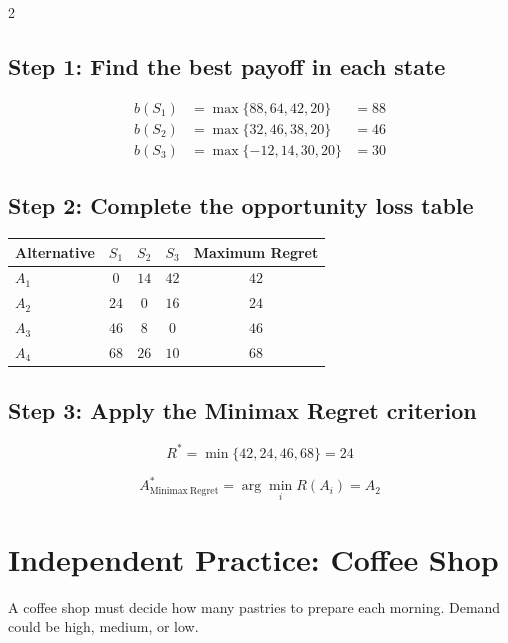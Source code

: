 \begin{multicols}{2}
		\subsection*{Step 1: Find the best payoff in each state}
		
		\[
		\begin{array}{lll}
			b(S_1) &= \max\{88,64,42,20\} &= 88 \\[3pt]
			b(S_2) &= \max\{32,46,38,20\} &= 46 \\[3pt]
			b(S_3) &= \max\{-12,14,30,20\} &= 30
		\end{array}
		\]
		
		\subsection*{Step 2: Complete the opportunity loss table}
		
		\begin{center}
			\renewcommand{\arraystretch}{1.5}
			\small
			\begin{tabular}{lcccc}
				\toprule
				Alternative & $S_1$ & $S_2$ & $S_3$ & Maximum Regret \\
				\midrule
				$A_1$ & $0$ & $14$ & $42$ & $42$ \\[3pt]
				$A_2$ & $24$ & $0$ & $16$ & $24$ \\[3pt]
				$A_3$ & $46$ & $8$ & $0$ & $46$ \\[3pt]
				$A_4$ & $68$ & $26$ & $10$ & $68$ \\
				\bottomrule
			\end{tabular}
		\end{center}
		
		\subsection*{Step 3: Apply the Minimax Regret criterion}
		
		\[
		R^*
		=
		\min\{42,24,46,68\}
		=
		24
		\]
		
		\[
		A^*_{\mathrm{Minimax\ Regret}}
		=
		\arg\min_i R(A_i)
		=
		A_2
		\]
		
		\newpage
		
		\section{Independent Practice: Coffee Shop}
		
		A coffee shop must decide how many pastries to prepare each morning.
		Demand could be high, medium, or low.
		

\end{multicols}
